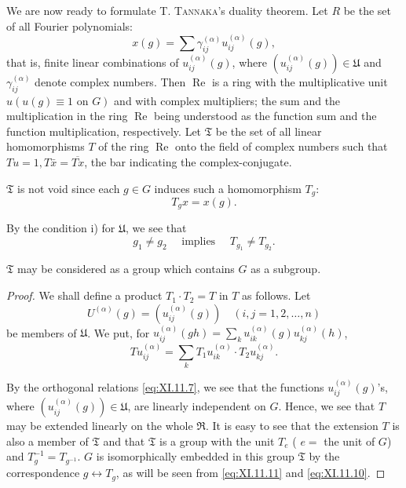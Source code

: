 We are now ready to formulate T. \textsc{Tannaka}'s duality theorem. Let $R$ be the set of all Fourier polynomials: 
\begin{equation}\label{eq:XI.11.8}
x (g) = \sum \gamma_{ij} ^{(\alpha)} u _{ij} ^{(\alpha)} (g),
\end{equation}
that is, finite linear combinations of $u_{ij}^{(\alpha)}(g)$, where $(u_{ij}^{(\alpha)}(g)) \in \mathfrak{U}$ and $\gamma_{ij}^{(\alpha)}$ denote complex numbers. Then $\operatorname{Re}$ is a ring with the multiplicative unit $u(u(g) \equiv 1 \text{ on } G)$ and with complex multipliers; the sum and the multiplication in the ring $\operatorname{Re}$ being understood as the function sum and the function multiplication, respectively. Let $\mathfrak{T}$ be the set of all linear homomorphisms $T$ of the ring $\operatorname{Re}$ onto the field of complex numbers such that 
$Tu = 1, T\bar{x} = \overline{Tx}$, the bar indicating the complex-conjugate. 


$\mathfrak{T}$ is not void since each $g \in G$ induces such a homomorphism $T_g$: 
\begin{equation}\label{eq:XI.11.9}
T _{g} x = x (g).
\end{equation}

By the condition i) for $\mathfrak{U}$, we see that 
\begin{equation}\label{eq:XI.11.10}
g _{1} \neq g _{2} \quad \text{ implies } \quad T _ {g _{1}} \neq T _ {g _{2}}.
\end{equation}

\begin{proposition}\label{prop:XI.11.Proposition.4} $\mathfrak{T}$ may be considered as a group which contains $G$ as a subgroup. 
\end{proposition}

\begin{proof}
 We shall define a product $T_{1} \cdot T_{2} = T$ in $T$ as follows. Let 
\[
U ^{(\alpha)} (g) = \left(u _{ij} ^{(\alpha)} (g)\right) \quad (i, j = 1, 2, \dots , n)
\]
be members of $\mathfrak{U}$. We put, for $u_{ij}^{(\alpha)}(gh) = \sum\limits_{k} u_{ik}^{(\alpha)}(g) u_{kj}^{(\alpha)}(h)$, 
\begin{equation}\label{eq:XI.11.11}
T u _{ij} ^{(\alpha)} = \sum\limits_{k} T _{1} u _{ik} ^{(\alpha)} \cdot T _{2} u _{kj} ^{(\alpha)}. \end{equation}

By the orthogonal relations \eqref{eq:XI.11.7}, we see that the functions $u_{ij}^{(\alpha)}(g)$'s, where $(u_{ij}^{(\alpha)}(g)) \in \mathfrak{U}$, are linearly independent on $G$. Hence, we see that $T$ may be extended linearly on the whole $\mathfrak{R}$. It is easy to see that the extension $T$ is also a member of $\mathfrak{T}$ and that $\mathfrak{T}$ is a group with the unit $T_e$ ( $e =$ the unit of $G$) and $T_g^{-1} = T_{g^{-1}}$. $G$ is isomorphically embedded in this group $\mathfrak{T}$ by the correspondence $g \leftrightarrow T_g$, as will be seen from \eqref{eq:XI.11.11} and \eqref{eq:XI.11.10}. 
\end{proof}

